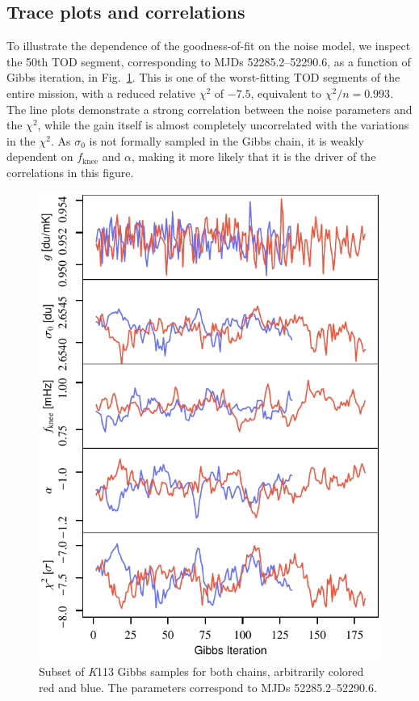 \documentclass[twocolumn]{../../common/aa}
\newcommand{\K}[0]{\textit K}
\begin{document}
\subsection{Trace plots and correlations}
\label{sec:traceplots}

To illustrate the dependence of the goodness-of-fit on the noise model,
we inspect the 50th TOD segment, corresponding to MJDs 52285.2--52290.6, as a
function of Gibbs iteration, in Fig.~\ref{fig:inst_K113_gibbs}. This is one of
the worst-fitting TOD segments of the entire mission, with a reduced relative
$\chi^2$ of $-7.5$, equivalent to $\chi^2/n=0.993$. The line plots demonstrate a strong correlation between the noise parameters and the $\chi^2$, while the gain itself is almost completely uncorrelated with the variations in the $\chi^2$. As $\sigma_0$ is not formally sampled in the Gibbs chain, it is weakly dependent on $f_\mathrm{knee}$ and $\alpha$, making it more likely that it is the driver of the correlations in this figure. 

\begin{figure}[t]
	\centering
	\includegraphics[width=\linewidth]{figures/instpar_CG_K113_samples_v1.pdf}
	\caption{Subset of \K113 Gibbs samples for both chains, arbitrarily colored red and blue. The parameters correspond to MJDs 52285.2--52290.6.}
	\label{fig:inst_K113_gibbs}
\end{figure}
\end{document}
